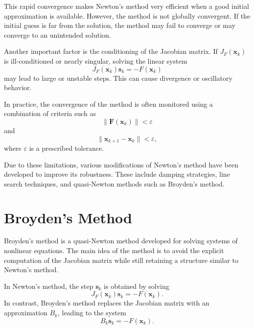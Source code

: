 This rapid convergence makes Newton's method very efficient when a good initial approximation is available. However, the method is not globally convergent. If the initial guess is far from the solution, the method may fail to converge or may converge to an unintended solution.

Another important factor is the conditioning of the Jacobian matrix. If \( J_F(\mathbf{x}_k) \) is ill-conditioned or nearly singular, solving the linear system
\begin{equation}
J_F(\mathbf{x}_k)\mathbf{s}_k = -F(\mathbf{x}_k)
\end{equation}
may lead to large or unstable steps. This can cause divergence or oscillatory behavior.

In practice, the convergence of the method is often monitored using a combination of criteria such as
\begin{equation}
\|\mathbf{F}(\mathbf{x}_k)\| < \varepsilon
\end{equation}
and
\begin{equation}
\|\mathbf{x}_{k+1} - \mathbf{x}_k\| < \varepsilon,
\end{equation}
where \( \varepsilon \) is a prescribed tolerance.

Due to these limitations, various modifications of Newton's method have been developed to improve its robustness. These include damping strategies, line search techniques, and quasi-Newton methods such as Broyden's method.

\section{Broyden's Method}

Broyden's method is a quasi-Newton method developed for solving systems of nonlinear equations. The main idea of the method is to avoid the explicit computation of the Jacobian matrix while still retaining a structure similar to Newton's method.

In Newton's method, the step \( \mathbf{s}_k \) is obtained by solving
\begin{equation}
J_F(\mathbf{x}_k)\mathbf{s}_k = -F(\mathbf{x}_k).
\end{equation}
In contrast, Broyden's method replaces the Jacobian matrix with an approximation \( B_k \), leading to the system
\begin{equation}
B_k \mathbf{s}_k = -F(\mathbf{x}_k).
\end{equation}

